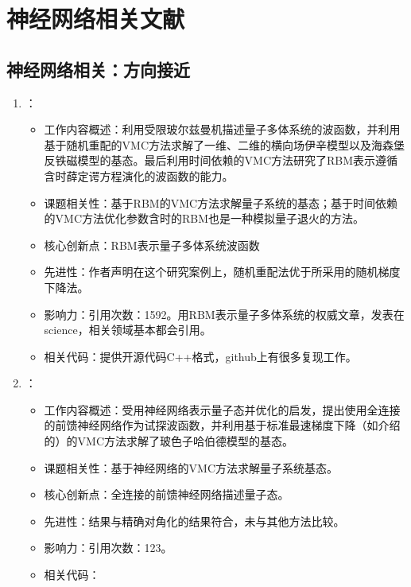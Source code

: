\chapter{神经网络相关文献}
\section{神经网络相关：方向接近}
    \begin{enumerate}
        \item \citet{carleo2017solving}：
            \begin{itemize}
                \item 工作内容概述：利用受限玻尔兹曼机描述量子多体系统的波函数，并利用基于随机重配\citep{sorella2007weak}的VMC方法求解了一维、二维的横向场伊辛模型以及海森堡反铁磁模型的基态。最后利用时间依赖的VMC方法\citep{carleo2012localization, carleo2014light}研究了RBM表示遵循含时薛定谔方程演化的波函数的能力。
                \item 课题相关性：基于RBM的VMC方法求解量子系统的基态；基于时间依赖的VMC方法优化参数含时的RBM也是一种模拟量子退火的方法。
                \item 核心创新点：RBM表示量子多体系统波函数
                \item 先进性：作者声明在这个研究案例上，随机重配法优于\citet{harju1997stochastic}所采用的随机梯度下降法。
                \item 影响力：引用次数：1592。用RBM表示量子多体系统的权威文章，发表在science，相关领域基本都会引用。
                \item 相关代码：提供开源代码C++格式，github上有很多复现工作。
            \end{itemize}
            \item \citet{saito2017solving}：
            \begin{itemize}
                \item 工作内容概述：受\citet{carleo2017solving}用神经网络表示量子态并优化的启发，提出使用全连接的前馈神经网络作为试探波函数，并利用基于标准最速梯度下降（如\citet{becca2017quantum}介绍的）的VMC方法求解了玻色子哈伯德模型的基态。
                \item 课题相关性：基于神经网络的VMC方法求解量子系统基态。
                \item 核心创新点：全连接的前馈神经网络描述量子态。
                \item 先进性：结果与精确对角化的结果符合，未与其他方法比较。
                \item 影响力：引用次数：123。
                \item 相关代码：

\end{itemize}
\end{enumerate}
